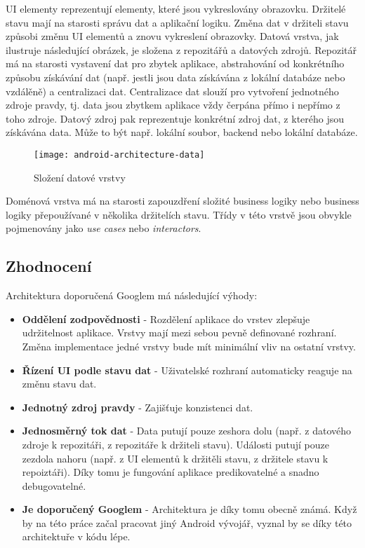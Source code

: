\noindent UI elementy reprezentují elementy, které jsou vykreslovány obrazovku. Držitelé stavu mají na starosti správu dat a aplikační logiku. Změna dat v držiteli stavu způsobi změnu UI elementů a znovu vykreslení obrazovky. Datová vrstva, jak ilustruje následující obrázek, je složena z repozitářů \linebreak  a datových zdrojů. Repozitář má na starosti vystavení dat pro zbytek aplikace, abstrahování od konkrétního způsobu získávání dat (např. jestli jsou data získávána z lokální databáze nebo vzdálěně) a centralizaci dat.  Centralizace dat slouží pro vytvoření jednotného zdroje \linebreak pravdy, tj. data jsou zbytkem aplikace vždy čerpána přímo i nepřímo z toho zdroje. Datový zdroj pak reprezentuje konkrétní zdroj dat, z kterého jsou získávána data. Může to být \linebreak např. lokální soubor, backend nebo lokální databáze. 

\begin{figure}[H]
	\centering
	
	\texttt{[image: android-architecture-data]}
	
	\caption{Složení datové vrstvy \cite{android-architecture}}
	\label{fig:android-architecture-data}
\end{figure}

\noindent Doménová vrstva má na starosti zapouzdření složité business logiky nebo business logiky přepoužívané v několika držitelích stavu. Třídy v této vrstvě jsou obvykle pojmenovány jako \textit{use cases} nebo \textit{interactors}.

\subsection{Zhodnocení}
Architektura doporučená Googlem má následující výhody:

\begin{itemize}
	\item \textbf{Oddělení zodpovědnosti} - Rozdělení aplikace do vrstev zlepšuje udržitelnost aplikace.  Vrstvy mají mezi sebou pevně definované rozhraní. Změna implementace jedné vrstvy bude mít minimální vliv na ostatní vrstvy.

	\item \textbf{Řízení UI podle stavu dat} - Uživatelské rozhraní automaticky reaguje na změnu stavu dat. 

	\item \textbf{Jednotný zdroj pravdy} - Zajišťuje konzistenci dat.

	\item \textbf{Jednosměrný tok dat} - Data putují pouze zeshora dolu (např. z datového zdroje k repozitáři, z repozitáře k držiteli stavu). Události putují pouze zezdola nahoru (např. z UI elementů k držitěli stavu, z držitele stavu k repoiztáři). Díky tomu je fungování aplikace predikovatelné a snadno debugovatelné.

	\item \textbf{Je doporučený Googlem} - Architektura je díky tomu obecně známá. Když by na této práce začal pracovat jiný Android vývojář, vyznal by se díky této architektuře v kódu lépe.
\end{itemize}

